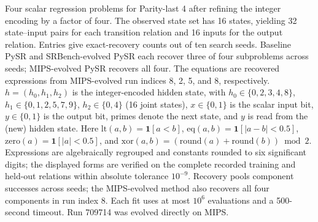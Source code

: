 \begin{table}[t]
\caption{Four scalar regression problems for Parity-last 4 after refining the integer encoding by a factor of four. The observed state set has 16 states, yielding 32 state--input pairs for each transition relation and 16 inputs for the output relation. Entries give exact-recovery counts out of ten search seeds. Baseline PySR and SRBench-evolved PySR each recover three of four subproblems across seeds; MIPS-evolved PySR recovers all four. The equations are recovered expressions from MIPS-evolved run indices 8, 2, 5, and 8, respectively. $h=(h_0,h_1,h_2)$ is the integer-encoded hidden state, with $h_0\in\{0,2,3,4,8\}$, $h_1\in\{0,1,2,5,7,9\}$, $h_2\in\{0,4\}$ (16 joint states), $x\in\{0,1\}$ is the scalar input bit, $y\in\{0,1\}$ is the output bit, primes denote the next state, and $y$ is read from the (new) hidden state. Here $\mathrm{lt}(a,b)=\mathbf{1}[a<b]$, $\mathrm{eq}(a,b)=\mathbf{1}[|a-b|<0.5]$, $\mathrm{zero}(a)=\mathbf{1}[|a|<0.5]$, and $\mathrm{xor}(a,b)=(\mathrm{round}(a)+\mathrm{round}(b))\bmod 2$. Expressions are algebraically regrouped and constants rounded to six significant digits; the displayed forms are verified on the complete recorded training and held-out relations within absolute tolerance $10^{-9}$. Recovery pools component successes across seeds; the MIPS-evolved method also recovers all four components in run index 8. Each fit uses at most $10^6$ evaluations and a 500-second timeout. Run 709714 was evolved directly on MIPS.}
\label{tab:mips-parity-last4}
\end{table}
